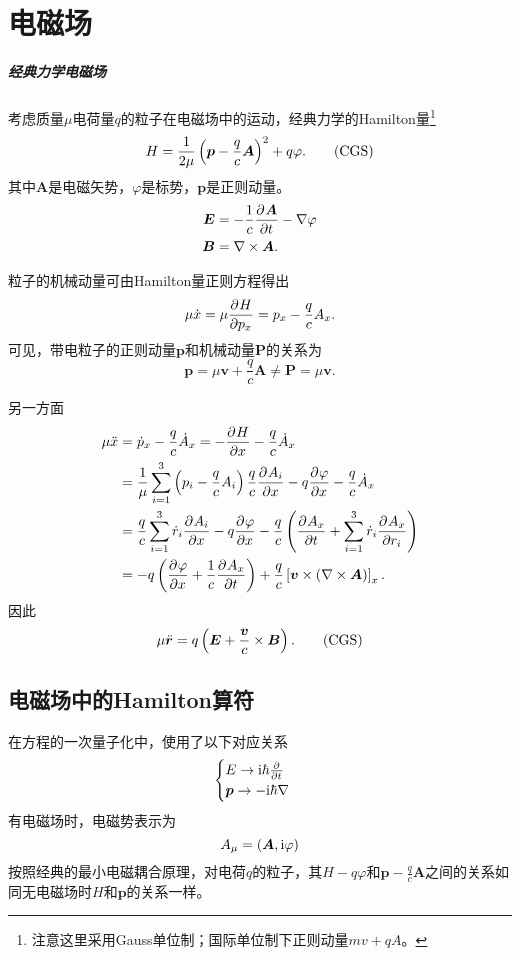 \chapter{电磁场}
\paragraph{经典力学电磁场}考虑质量$\mu$电荷量$q$的粒子在电磁场中的运动，经典力学的Hamilton量\footnote{注意这里采用Gauss单位制；国际单位制下正则动量$mv+qA$。}
\[
	H=\frac1{2\mu}\kh{\bm p-\frac qc\bm A}^2+q\varphi.\CGS
\]
其中$\bm A$是电磁矢势，$\varphi$是标势，$\bm p$是正则动量。
\begin{align*}
	\bm E & =-\frac1c\frac{\partial^{{}}\bm A}{\partial{t}^{{}}}-\nabla\varphi \\
	\bm B & =\nabla\times\bm A.
\end{align*}

粒子的机械动量可由Hamilton量正则方程得出
\[
	\mu\dot x=\mu\frac{\partial^{{}}H}{\partial{p_x}^{{}}}=p_x-\frac qcA_x.
\]
可见，带电粒子的正则动量$\bm p$和机械动量$\bm P$的关系为
\[
	\bm p=\mu\bm v+\frac qc\bm A\neq\bm P=\mu\bm v.
\]

另一方面
\begin{align*}
	\mu\ddot x & =\dot p_x-\frac qc\dot A_x=-\frac{\partial^{{}}H}{\partial{x}^{{}}}-\frac qc\dot A_x                                                        \\
	           & =\frac1\mu\sum_{i=1}^3\left(p_i-\frac qcA_i\right)\frac qc\frac{\partial^{{}}A_i}{\partial{x}^{{}}}-q\frac{\partial^{{}}\varphi}{\partial{x}^{{}}}-\frac qc\dot A_x                    \\
	           & =\frac qc\sum_{i=1}^3\dot r_i\frac{\partial^{{}}A_i}{\partial{x}^{{}}}-q\frac{\partial^{{}}\varphi}{\partial{x}^{{}}}-\frac qc\left(\frac{\partial^{{}}A_x}{\partial{t}^{{}}}+\sum_{i=1}^3\dot r_i\frac{\partial^{{}}A_x}{\partial{r_i}^{{}}}\right) \\
	           & =-q\left(\frac{\partial^{{}}\varphi}{\partial{x}^{{}}}+\frac1c\frac{\partial^{{}}A_x}{\partial{t}^{{}}}\right)+\frac qc\left[\bm v\times\left(\nabla\times\bm A\right)\right]_x.
\end{align*}
因此
\[
	\mu\ddot{\bm r}=q\kh{\bm E+\frac{\bm v}c\times\bm B}.\CGS
\]
\section{电磁场中的Hamilton算符}
在\Schr 方程的一次量子化中，使用了以下对应关系
\begin{align}
	\begin{cases}
		E\to\mathrm{i}\hbar\frac{\partial^{{}}}{\partial{t}^{{}}} \\
		\bm p\to-\mathrm{i}\hbar\nabla
	\end{cases}
\end{align}
有电磁场时，电磁势表示为
\[
A_\mu=\left(\bm A,\mathrm{i}\varphi\right)
\]
按照经典的最小电磁耦合原理，对电荷$q$的粒子，其$H-q\varphi$和$\bm p-\frac qc\bm A$之间的关系如同无电磁场时$H$和$\bm p$的关系一样。

